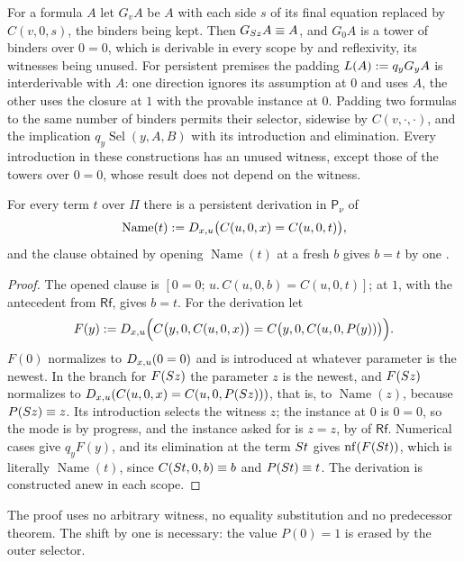 For a formula $A$ let $G_vA$ be $A$ with each side $s$ of its final equation
replaced by $C(v,0,s)$, the binders being kept.  Then
$G_{S z}A\equiv A$, and $G_0A$ is a tower of binders over $0=0$, which is
derivable in every scope by  and reflexivity, its witnesses
being unused.  For persistent premises the padding $L(A)\mathrel{:=} q_yG_yA$ is
interderivable with $A$: one direction ignores its assumption at $0$ and
uses $A$, the other uses the closure at $1$ with the provable instance at
$0$.  Padding two formulas to the same number of binders permits their
selector, sidewise by $C(v,\cdot,\cdot)$, and the implication
$q_y\operatorname{Sel}(y,A,B)$ with its introduction and elimination.
Every introduction in these constructions has an unused witness, except
those of the towers over $0=0$, whose result does not depend on the witness.

\begin{lemma}
\label{wit:lem:name-recursor}
For every term $t$ over $\Pi$ there is a persistent derivation in
$\mathsf{P}_{\nu}$ of
\[
 \operatorname{Name}(t)\mathrel{:=}D_{x,u}\bigl(C(u,0,x)=C(u,0,t)\bigr),
\]
and the clause obtained by opening $\operatorname{Name}(t)$ at a fresh $b$
gives $b=t$ by one .
\end{lemma}

\begin{proof}
The opened clause is $[0=0;\,u.\,C(u,0,b)=C(u,0,t)]$;  at $1$,
with the antecedent from $\mathsf{Rf}$, gives $b=t$.  For the derivation let
\[
 F(y)\mathrel{:=}D_{x,u}\Bigl(C\bigl(y,0,C(u,0,x)\bigr)
   =C\bigl(y,0,C(u,0,P(y))\bigr)\Bigr).
\]
$F(0)$ normalizes to $D_{x,u}(0=0)$ and is introduced at whatever parameter
is the newest.  In the branch for $F(S z)$ the parameter $z$ is the
newest, and $F(S z)$ normalizes to
$D_{x,u}(C(u,0,x)=C(u,0,P(S z)))$, that is, to
$\operatorname{Name}(z)$, because $P(S z)\equiv z$.  Its introduction
selects the witness $z$; the instance at $0$ is $0=0$, so the mode is by
progress, and the instance asked for is $z=z$, by  of
$\mathsf{Rf}$.  Numerical cases give $q_yF(y)$, and its elimination at the
term $S t$ gives $\operatorname{nf}(F(S t))$, which is literally
$\operatorname{Name}(t)$, since $C(S t,0,b)\equiv b$ and
$P(S t)\equiv t$.  The derivation is constructed anew in each scope.
\end{proof}

The proof uses no arbitrary witness, no equality substitution and no
predecessor theorem.  The shift by one is necessary: the value $P(0)=1$ is
erased by the outer selector.

